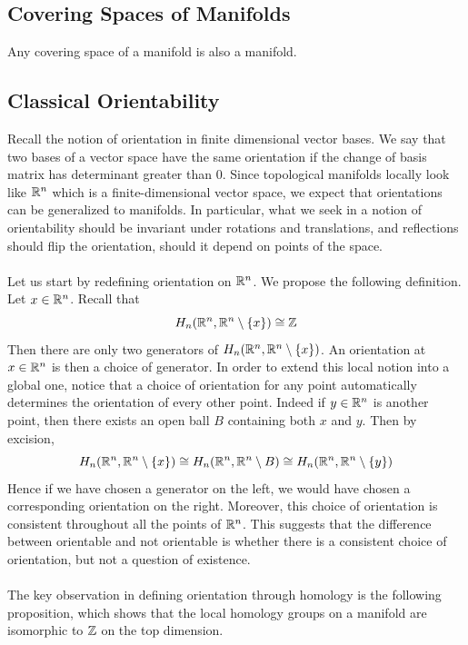 \documentclass[a4paper]{article}
\begin{document}
\subsection{Covering Spaces of Manifolds}
\begin{prp}{}{} Any covering space of a manifold is also a manifold. 
\end{prp}

\subsection{Classical Orientability}
Recall the notion of orientation in finite dimensional vector bases. We say that two bases of a vector space have the same orientation if the change of basis matrix has determinant greater than $0$. Since topological manifolds locally look like $\mathbb{R}^n$ which is a finite-dimensional vector space, we expect that orientations can be generalized to manifolds. In particular, what we seek in a notion of orientability should be invariant under rotations and translations, and reflections should flip the orientation, should it depend on points of the space. \\~\\

Let us start by redefining orientation on $\mathbb{R}^n$. We propose the following definition. Let $x\in\mathbb{R}^n$. Recall that $$H_n(\mathbb{R}^n,\mathbb{R}^n\setminus\{x\})\cong\mathbb{Z}$$ Then there are only two generators of $H_n(\mathbb{R}^n,\mathbb{R}^n\setminus\{x\})$. An orientation at $x\in\mathbb{R}^n$ is then a choice of generator. In order to extend this local notion into a global one, notice that a choice of orientation for any point automatically determines the orientation of every other point. Indeed if $y\in\mathbb{R}^n$ is another point, then there exists an open ball $B$ containing both $x$ and $y$. Then by excision, $$H_n(\mathbb{R}^n,\mathbb{R}^n\setminus\{x\})\cong H_n(\mathbb{R}^n,\mathbb{R}^n\setminus B)\cong H_n(\mathbb{R}^n,\mathbb{R}^n\setminus\{y\})$$ Hence if we have chosen a generator on the left, we would have chosen a corresponding orientation on the right. Moreover, this choice of orientation is consistent throughout all the points of $\mathbb{R}^n$. This suggests that the difference between orientable and not orientable is whether there is a consistent choice of orientation, but not a question of existence. \\~\\

The key observation in defining orientation through homology is the following proposition, which shows that the local homology groups on a manifold are isomorphic to $\mathbb{Z}$ on the top dimension. 
\end{document}
